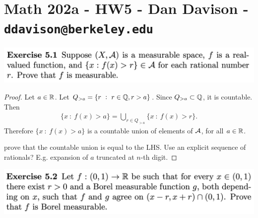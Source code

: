 \section*{Math 202a - HW5 - Dan Davison - \texttt{ddavison@berkeley.edu}}

\begin{mdframed}
\includegraphics[width=400pt]{img/analysis--berkeley-202a-hw06-ab56.png}
\end{mdframed}

\begin{proof}
  Let $a \in \mathbb{R}$. Let $Q_{>a} = \{r ~:~ r \in \mathbb{Q}, r > a\}$. Since $Q_{>a} \subset \mathbb{Q}$, it is countable. Then
  \begin{align*}
    \{x ~:~ f(x) > a\} = \bigcup_{r \in Q_{>a}} \{x ~:~ f(x) > r\}.
  \end{align*}
  Therefore $\{x ~:~ f(x) > a\}$ is a countable union of elements of $\mathcal A$, for all $a \in \mathbb{R}$.

   prove that the countable union is equal to the LHS. Use an explicit sequence of rationals? E.g. expansion
  of $a$ truncated at $n$-th digit.
\end{proof}



\newpage
\begin{mdframed}
\includegraphics[width=400pt]{img/analysis--berkeley-202a-hw06-927a.png}
\end{mdframed}

